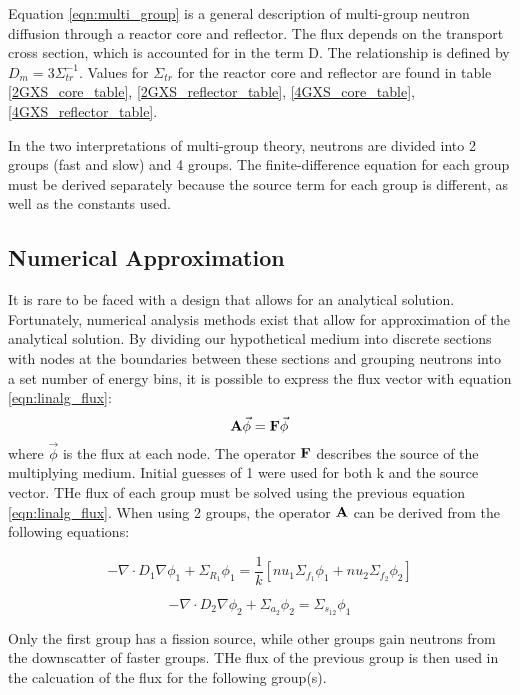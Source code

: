 \documentclass[../main.tex]{subfiles}
\begin{document}
	Equation \ref{eqn:multi_group} is a general description of multi-group neutron diffusion through a reactor core and reflector. The flux depends on the transport cross section, which is accounted for in the term D.  The relationship is defined by $D_m = 3 \Sigma_{tr}^{-1}$. Values for $\Sigma_{tr}$ for the reactor core and reflector are found in table \ref{2GXS_core_table}, \ref{2GXS_reflector_table}, \ref{4GXS_core_table}, \ref{4GXS_reflector_table}.
	
	In the two interpretations of multi-group theory, neutrons are divided into 2 groups (fast and slow) and 4 groups.  The finite-difference equation for each group must be derived separately because the source term for each group is different, as well as the constants used. 

	
\subsection{Numerical Approximation} \label{ssec:numerical}
	It is rare to be faced with a design that allows for an analytical solution. Fortunately, numerical analysis methods exist that allow for approximation of the analytical solution. By dividing our hypothetical medium into discrete sections with nodes at the boundaries between these sections and grouping neutrons into a set number of energy bins, it is possible to express the flux vector with equation \ref{eqn:linalg_flux}:
	\begin{equation}
		\mathbf{A} \vec{\phi} = \mathbf{F} \vec{\phi}
		\label{eqn:linalg_flux}
	\end{equation}
	where $\vec{\phi}$ is the flux at each node. The operator $\mathbf{F}$ describes the source of the multiplying medium.  Initial guesses of 1 were used for both k and the source vector.  THe flux of each group must be solved using the previous equation  \ref{eqn:linalg_flux}.  When using 2 groups, the operator $\mathbf{A}$ can be derived from the following equations:
	
	\begin{equation*}
		- \nabla \cdot D_{1} \nabla \phi_{1}+ \Sigma_{R_1} \phi_1 = \frac{1}{k} [nu_1 \Sigma_{f_1} \phi_{1} + nu_2 \Sigma_{f_2} \phi_{2}] 
	\end{equation*}
	
	\begin{equation*}
		- \nabla \cdot D_{2} \nabla \phi_{2}+ \Sigma_{a_2} \phi_2 = \Sigma_{s_{12}} \phi_1
	\end{equation*}

Only the first group has a fission source, while other groups gain neutrons from the downscatter of faster groups.  THe flux of the previous group is then used in the calcuation of the flux for the following group(s).
\end{document}
